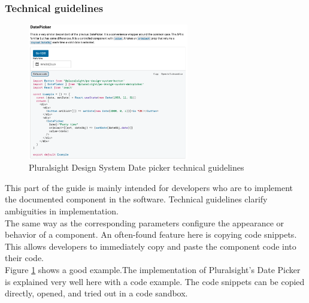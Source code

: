 \subsubsection{Technical guidelines} \label{tech_guideline}
\begin{figure}
	\includegraphics[width=7cm]{images/pluralsight_date-picker_technical.png}
	\caption{Pluralsight Design System Date picker technical guidelines \cite{pluralsight_ds_nodate}}
	\label{pluralsight_date_picker}
	\end{figure}
This part of the guide is mainly intended for developers who are to implement the documented component in the software. Technical guidelines clarify ambiguities in implementation.  \cite{macdonald_practical_2019} \\
The same way as the corresponding parameters configure the appearance or behavior of a component. An often-found feature here is copying code snippets. This allows developers to immediately copy and paste the component code into their code. \cite{vesselov_building_2019} \\
Figure \ref{pluralsight_date_picker} shows a good example.The implementation of Pluralsight's Date Picker is explained very well here with a code example. The code snippets can be copied directly, opened, and tried out in a code sandbox.

